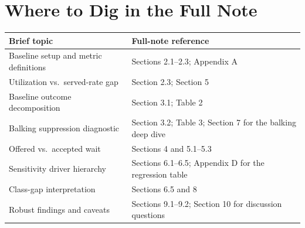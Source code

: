 \documentclass[11pt]{article}
\begin{document}
\section*{Where to Dig in the Full Note}

\begin{tabularx}{\textwidth}{L{0.33\textwidth}Y}
\toprule
Brief topic & Full-note reference \\
\midrule
Baseline setup and metric definitions & Sections 2.1--2.3; Appendix A \\
Utilization vs.\ served-rate gap & Section 2.3; Section 5 \\
Baseline outcome decomposition & Section 3.1; Table 2 \\
Balking suppression diagnostic & Section 3.2; Table 3; Section 7 for the balking deep dive \\
Offered vs.\ accepted wait & Sections 4 and 5.1--5.3 \\
Sensitivity driver hierarchy & Sections 6.1--6.5; Appendix D for the regression table \\
Class-gap interpretation & Sections 6.5 and 8 \\
Robust findings and caveats & Sections 9.1--9.2; Section 10 for discussion questions \\
\bottomrule
\end{tabularx}
\end{document}

